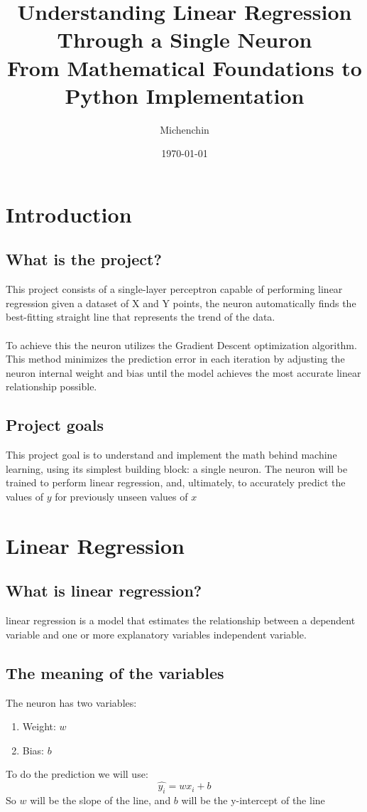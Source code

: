 \documentclass[12pt,a4paper]{article}
\title{
	Understanding Linear Regression Through a Single Neuron\\
	{\large From Mathematical Foundations to Python Implementation}
}
\author{Michenchin}
\date{\today}
\begin{document}
	\maketitle
	\newpage
	\tableofcontents
	\newpage
	
	
	\section{Introduction}
		\subsection{What is the project?}
			This project consists of a single-layer perceptron capable of performing linear regression given a dataset of X and Y points, the neuron automatically finds the best-fitting straight line that represents the trend of the data.\\
			\\
			To achieve this the neuron utilizes the Gradient Descent optimization algorithm. This method minimizes the prediction error in each iteration by adjusting the neuron internal weight and bias until the model achieves the most accurate linear relationship possible.\\
		\subsection{Project goals}
			This project goal is to understand and implement the math behind machine learning, using its simplest building block: a single neuron.
			The neuron will be trained to perform linear regression, and, ultimately, to accurately predict the values of $y$ for previously unseen values of $x$
	\section{Linear Regression}
		\subsection{What is linear regression?}
			linear regression is a model that estimates the relationship between a dependent variable and one or more explanatory variables independent variable.
		\subsection{The meaning of the variables}
			The neuron has two variables:
				\begin{enumerate}
					\item Weight: $w$
					\item Bias: $b$
				\end{enumerate}
			To do the prediction we will use:\\
			$$\hat{y_i}=wx_i+b$$
			So $w$ will be the slope of the line, and $b$ will be the y-intercept of the line
\end{document}
